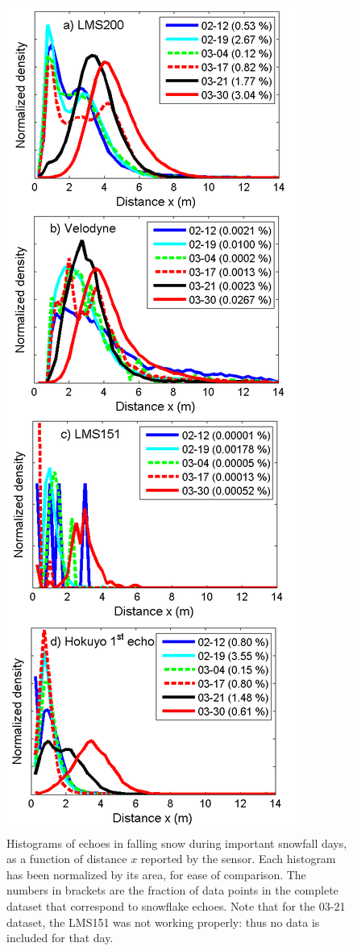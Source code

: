 \begin{figure}[th]
    \centering
    \includegraphics[width=0.80\linewidth]{./img/Histograms.png}
    \caption{Histograms of echoes in falling snow during important snowfall days, as a function of distance $x$ reported by the sensor. Each histogram has been normalized by its area, for ease of comparison. The numbers in brackets are the fraction of data points in the complete dataset that correspond to snowflake echoes. Note that for the 03-21 dataset, the LMS151 was not working properly: thus no data is included for that day. }
    \label{fig:Histograms}
\end{figure}


